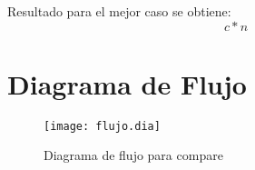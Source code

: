 \documentclass{article}
\begin{document}
Resultado para el mejor caso se obtiene: \\

\begin{equation}
\label{eq:best}
c*n
\end{equation}









\section{Diagrama de Flujo}
\begin{figure}[h]
\centering
 \texttt{[image: flujo.dia]}
 \caption{Diagrama de flujo para compare}
 \label{flujo}
 
\end{figure}
\end{document}
